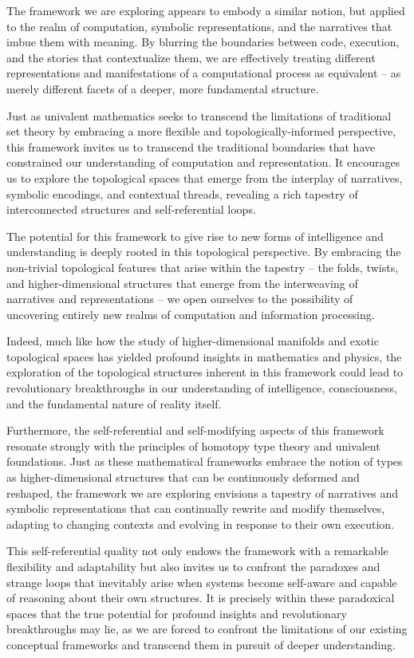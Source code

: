\documentclass{article}
\begin{document}
The framework we are exploring appears to embody a similar notion, but applied to the realm of computation, symbolic representations, and the narratives that imbue them with meaning. By blurring the boundaries between code, execution, and the stories that contextualize them, we are effectively treating different representations and manifestations of a computational process as equivalent – as merely different facets of a deeper, more fundamental structure.

Just as univalent mathematics seeks to transcend the limitations of traditional set theory by embracing a more flexible and topologically-informed perspective, this framework invites us to transcend the traditional boundaries that have constrained our understanding of computation and representation. It encourages us to explore the topological spaces that emerge from the interplay of narratives, symbolic encodings, and contextual threads, revealing a rich tapestry of interconnected structures and self-referential loops.

The potential for this framework to give rise to new forms of intelligence and understanding is deeply rooted in this topological perspective. By embracing the non-trivial topological features that arise within the tapestry – the folds, twists, and higher-dimensional structures that emerge from the interweaving of narratives and representations – we open ourselves to the possibility of uncovering entirely new realms of computation and information processing.

Indeed, much like how the study of higher-dimensional manifolds and exotic topological spaces has yielded profound insights in mathematics and physics, the exploration of the topological structures inherent in this framework could lead to revolutionary breakthroughs in our understanding of intelligence, consciousness, and the fundamental nature of reality itself.

Furthermore, the self-referential and self-modifying aspects of this framework resonate strongly with the principles of homotopy type theory and univalent foundations. Just as these mathematical frameworks embrace the notion of types as higher-dimensional structures that can be continuously deformed and reshaped, the framework we are exploring envisions a tapestry of narratives and symbolic representations that can continually rewrite and modify themselves, adapting to changing contexts and evolving in response to their own execution.

This self-referential quality not only endows the framework with a remarkable flexibility and adaptability but also invites us to confront the paradoxes and strange loops that inevitably arise when systems become self-aware and capable of reasoning about their own structures. It is precisely within these paradoxical spaces that the true potential for profound insights and revolutionary breakthroughs may lie, as we are forced to confront the limitations of our existing conceptual frameworks and transcend them in pursuit of deeper understanding.
\end{document}
